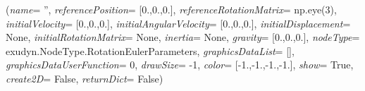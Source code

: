 %
\begin{flushleft}
\label{sec:mainsystemextensions:CreateRigidBody}
({\it name}= '', {\it referencePosition}= [0.,0.,0.], {\it referenceRotationMatrix}= np.eye(3), {\it initialVelocity}= [0.,0.,0.], {\it initialAngularVelocity}= [0.,0.,0.], {\it initialDisplacement}= None, {\it initialRotationMatrix}= None, {\it inertia}= None, {\it gravity}= [0.,0.,0.], {\it nodeType}= exudyn.NodeType.RotationEulerParameters, {\it graphicsDataList}= [], {\it graphicsDataUserFunction}= 0, {\it drawSize}= -1, {\it color}= [-1.,-1.,-1.,-1.], {\it show}= True, {\it create2D}= False, {\it returnDict}= False)
\end{flushleft}
\setlength{\itemindent}{0.7cm}
